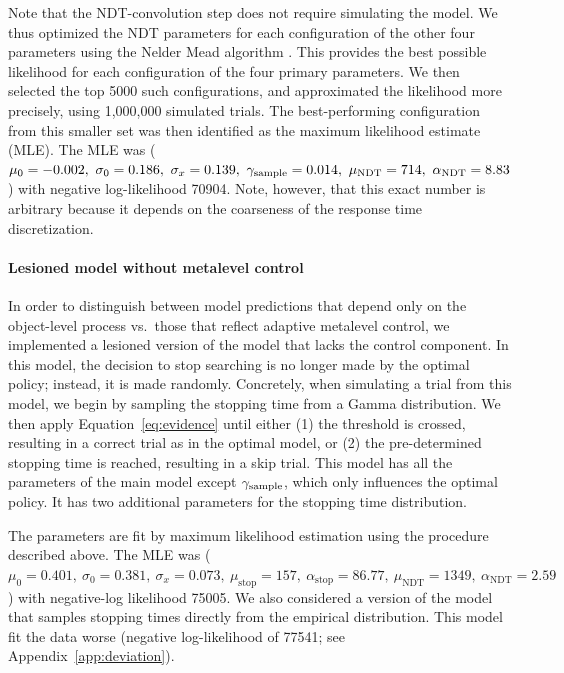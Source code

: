 Note that the NDT-convolution step does not require simulating the model. We thus optimized the NDT parameters for each configuration of the other four parameters using the Nelder Mead algorithm \citep{nelder1965simplex}. This provides the best possible likelihood for each configuration of the four primary parameters. We then selected the top 5000 such configurations, and approximated the likelihood more precisely, using 1,000,000 simulated trials. The best-performing configuration from this smaller set was then identified as the maximum likelihood estimate (MLE). The MLE was (\(
    \mu_0 = -0.002,\ 
    \sigma_0 = 0.186,\ 
    \sigma_x = 0.139,\ 
    \samplecost = 0.014,\ 
    \mu_\text{NDT} = 714,\ 
    \alpha_\text{NDT} = 8.83
\)) with negative log-likelihood 70904. Note, however, that this exact number is arbitrary because it depends on the coarseness of the response time discretization.

\paragraph{Lesioned model without metalevel control}

In order to distinguish between model predictions that depend only on the object-level process vs.~those that reflect adaptive metalevel control, we implemented a lesioned version of the model that lacks the control component. In this model, the decision to stop searching is no longer made by the optimal policy; instead, it is made randomly. Concretely, when simulating a trial from this model, we begin by sampling the stopping time from a Gamma distribution. We then apply Equation~\ref{eq:evidence} until either (1) the threshold is crossed, resulting in a correct trial as in the optimal model, or (2) the pre-determined stopping time is reached, resulting in a skip trial. This model has all the parameters of the main model except $\gamma_\text{sample}$, which only influences the optimal policy. It has two additional parameters for the stopping time distribution.

The parameters are fit by maximum likelihood estimation using the procedure described above. The MLE was (\(
    \mu_0 = 0.401,\ 
    \sigma_0 = 0.381,\ 
    \sigma_x = 0.073,\ 
    \mu_\text{stop} = 157,\ 
    \alpha_\text{stop} = 86.77,\ 
    \mu_\text{NDT} = 1349,\ 
    \alpha_\text{NDT} = 2.59
\)) with negative-log likelihood 75005. We also considered a version of the model that samples stopping times directly from the empirical distribution. This model fit the data worse (negative log-likelihood of 77541; see Appendix~\ref{app:deviation}).

